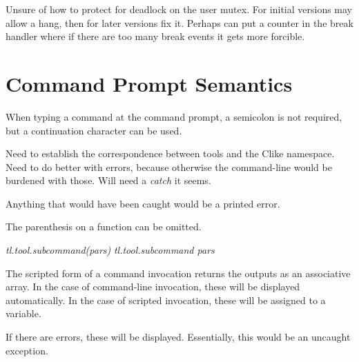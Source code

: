 Unsure of how to protect for deadlock on the user mutex.  For initial versions may allow a hang,
then for later versions fix it.  Perhaps can put a counter in the break handler where if there are
too many break events it gets more forcible.


\section{Command Prompt Semantics}
\label{ccik2:scps0}

When typing a command at the command prompt, a semicolon is not required, but a continuation character can be
used.

Need to establish the correspondence between tools and the Clike namespace.  Need to do better with errors, because otherwise the
command-line would be burdened with those.  Will need a \emph{catch} it seems.

Anything that would have been caught would be a printed error.

The parenthesis on a function can be omitted.

\emph{tl.tool.subcommand(pars)}
\emph{tl.tool.subcommand pars}

The scripted form of a command invocation returns the outputs as an associative array.  In the
case of command-line invocation, these will be displayed automatically.  In the case of scripted
invocation, these will be assigned to a variable.

If there are errors, these will be displayed.  Essentially, this would be an uncaught
exception.



